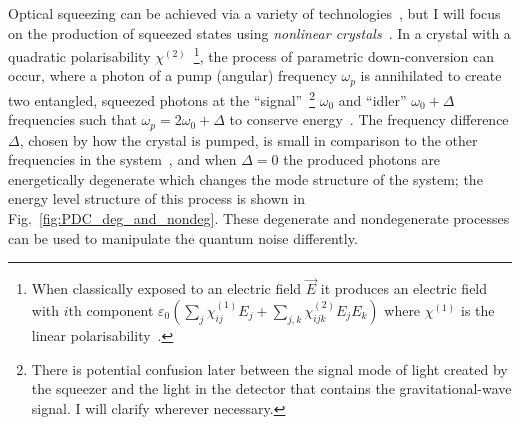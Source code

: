 Optical squeezing can be achieved via a variety of technologies~\cite{}, but I will focus on the production of squeezed states using \emph{nonlinear crystals}~\cite{}. In a crystal with a quadratic polarisability $\chi^{(2)}$~\footnote{When classically exposed to an electric field $\vec E$ it produces an electric field with $i\text{th}$ component $\varepsilon_0 (\sum_j \chi_{ij}^{(1)} E_j + \sum_{j,k} \chi_{ijk}^{(2)} E_j E_k)$ where $\chi^{(1)}$ is the linear polarisability~\cite{theresNoRefinKirkthesis?}.}, the process of parametric down-conversion can occur, where a photon of a pump (angular) frequency $\omega_p$ is annihilated to create two entangled, squeezed photons at the ``signal''~\footnote{There is potential confusion later between the signal mode of light created by the squeezer and the light in the detector that contains the gravitational-wave signal. I will clarify wherever necessary.} $\omega_0$ and ``idler'' $\omega_0+\Delta$ frequencies such that $\omega_p=2\omega_0+\Delta$ to conserve energy~\cite{}. The frequency difference $\Delta$, chosen by how the crystal is pumped, is small in comparison to the other frequencies in the system~\cite{}, and when $\Delta=0$ the produced photons are energetically degenerate which changes the mode structure of the system; the energy level structure of this process is shown in Fig.~\ref{fig:PDC_deg_and_nondeg}. %
These degenerate and nondegenerate processes can be used to manipulate the quantum noise differently. %




